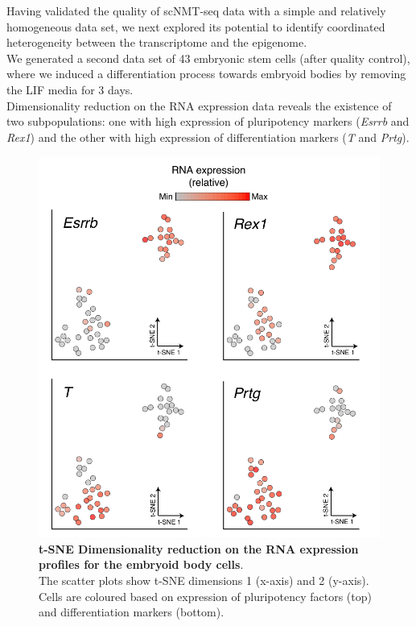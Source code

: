 Having validated the quality of scNMT-seq data with a simple and relatively homogeneous data set, we next explored its potential to identify coordinated heterogeneity between the transcriptome and the epigenome.\\
We generated a second data set of 43 embryonic stem cells (after quality control), where we induced a differentiation process towards embryoid bodies by removing the LIF media for 3 days.\\Dimensionality reduction on the RNA expression data reveals the existence of two subpopulations: one with high expression of pluripotency markers (\textit{Esrrb} and \textit{Rex1}) and the other with high expression of differentiation markers (\textit{T} and \textit{Prtg}).



\begin{figure}[H]
	\centering
	\includegraphics[width=0.8\linewidth]{scNMT_EB_RNA}
	\caption[]{\textbf{t-SNE Dimensionality reduction on the RNA expression profiles for the embryoid body cells}.\\
	The scatter plots show t-SNE dimensions 1 (x-axis) and 2 (y-axis). Cells are coloured based on expression of pluripotency factors (top) and differentiation markers (bottom). }
	\label{fig:scnmt_eb_rna}
\end{figure}


